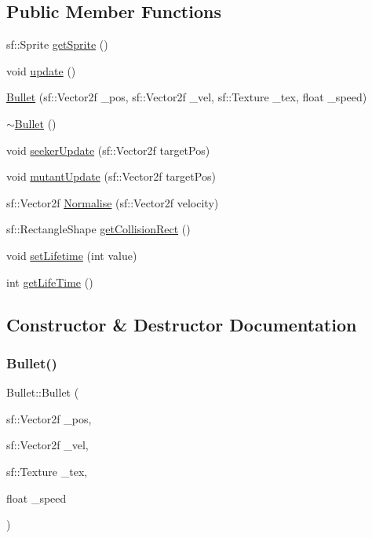 \subsection*{Public Member Functions}
\begin{DoxyCompactItemize}
\item 
sf\+::\+Sprite \hyperlink{class_bullet_aa313bc0e2c9fd200c526cb6fe320462c}{get\+Sprite} ()
\item 
void \hyperlink{class_bullet_a32f4a0611fe2dd245fee955d14ca1f68}{update} ()
\item 
\hyperlink{class_bullet_a479ca2fa9508190c8900f64584cbd7a0}{Bullet} (sf\+::\+Vector2f \+\_\+pos, sf\+::\+Vector2f \+\_\+vel, sf\+::\+Texture \+\_\+tex, float \+\_\+speed)
\item 
\hyperlink{class_bullet_aaeb5cb41d7db89f49007b08b41f1bfcf}{$\sim$\+Bullet} ()
\item 
void \hyperlink{class_bullet_add6e90fd23ded0a93ceaa2d489060591}{seeker\+Update} (sf\+::\+Vector2f target\+Pos)
\item 
void \hyperlink{class_bullet_a3af27cff51b293953e03bd4b749b6b8d}{mutant\+Update} (sf\+::\+Vector2f target\+Pos)
\item 
sf\+::\+Vector2f \hyperlink{class_bullet_a77e05d1fe031b205bfcfa388b13820c4}{Normalise} (sf\+::\+Vector2f velocity)
\item 
sf\+::\+Rectangle\+Shape \hyperlink{class_bullet_afa5ea4cb422dad6a578071ee86494a28}{get\+Collision\+Rect} ()
\item 
void \hyperlink{class_bullet_ae26b908cf0b00513a84cbfeb6582dfed}{set\+Lifetime} (int value)
\item 
int \hyperlink{class_bullet_a974be9eb4bd0cba53f578c7160fe2f87}{get\+Life\+Time} ()
\end{DoxyCompactItemize}


\subsection{Constructor \& Destructor Documentation}
\mbox{\label{class_bullet_a479ca2fa9508190c8900f64584cbd7a0}} 
\subsubsection{\texorpdfstring{Bullet()}{Bullet()}}
{\footnotesize\ttfamily Bullet\+::\+Bullet (\begin{DoxyParamCaption}\item[{sf\+::\+Vector2f}]{\+\_\+pos,  }\item[{sf\+::\+Vector2f}]{\+\_\+vel,  }\item[{sf\+::\+Texture}]{\+\_\+tex,  }\item[{float}]{\+\_\+speed }\end{DoxyParamCaption})}

